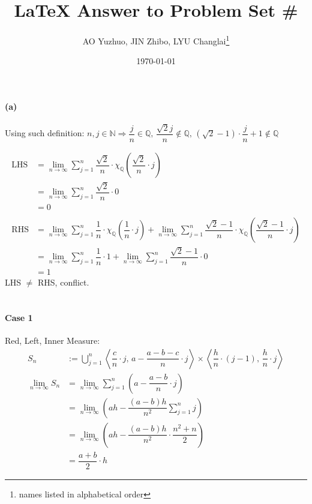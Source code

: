 \documentclass[11pt]{article}
\title{\LaTeX{} Answer to Problem Set \#}
\author{AO Yuzhuo, JIN Zhibo, LYU Changlai\thanks{names listed in alphabetical order}}
\date{\today}
\def\to{\rightarrow}
\begin{document}
\maketitle

\section{}
\paragraph{(a)}
Using such definition: $n,j \in \mathbb{N} \Rightarrow \dfrac{j}{n} \in \mathbb{Q} ,\, \dfrac{\sqrt{2}j}{n} \notin \mathbb{Q} ,\, (\sqrt{2}-1) \cdot \dfrac{j}{n}+1 \notin \mathbb{Q}$

$$\begin{aligned}
\text{LHS} &= \lim\limits_{n\to\infty} \sum\limits_{j=1}^n \dfrac{\sqrt{2}}{n} \cdot \chi_\mathbb{Q} \left( \dfrac{\sqrt{2}}{n} \cdot j \right) \\
&= \lim\limits_{n\to\infty} \sum\limits_{j=1}^n \dfrac{\sqrt{2}}{n} \cdot 0 \\
&= 0
\\\\
\text{RHS} &= \lim\limits_{n\to\infty} \sum\limits_{j=1}^n \dfrac{1}{n} \cdot \chi_\mathbb{Q} \left( \dfrac{1}{n} \cdot j \right) + \lim\limits_{n\to\infty} \sum\limits_{j=1}^n \dfrac{\sqrt{2}-1}{n} \cdot \chi_\mathbb{Q} \left( \dfrac{\sqrt{2}-1}{n} \cdot j \right) \\
&= \lim\limits_{n\to\infty} \sum\limits_{j=1}^n \dfrac{1}{n} \cdot 1 + \lim\limits_{n\to\infty} \sum\limits_{j=1}^n \dfrac{\sqrt{2}-1}{n} \cdot 0 \\
&= 1
\end{aligned}$$
LHS $\ne$ RHS, conflict.

\section{}
\paragraph{Case 1}

Red, Left, Inner Measure:
$$\begin{aligned}
S_n &:= \bigcup_{j=1}^n \left< \dfrac{c}{n} \cdot j ,\, a - \dfrac{a-b-c}{n} \cdot j \right> \times \left< \dfrac{h}{n} \cdot (j-1) ,\, \dfrac{h}{n} \cdot j \right> \\
\lim\limits_{n\to\infty} S_n &= \lim\limits_{n\to\infty} \sum_{j=1}^n \left( a - \dfrac{a-b}{n} \cdot j \right) \\
&= \lim\limits_{n\to\infty} \left( ah - \dfrac{(a-b)h}{n^2} \sum_{j=1}^n j \right) \\
&= \lim\limits_{n\to\infty} \left( ah - \dfrac{(a-b)h}{n^2} \cdot \dfrac{n^2+n}{2} \right) \\
&= \dfrac{a+b}{2} \cdot h
\end{aligned}$$
\end{document}
